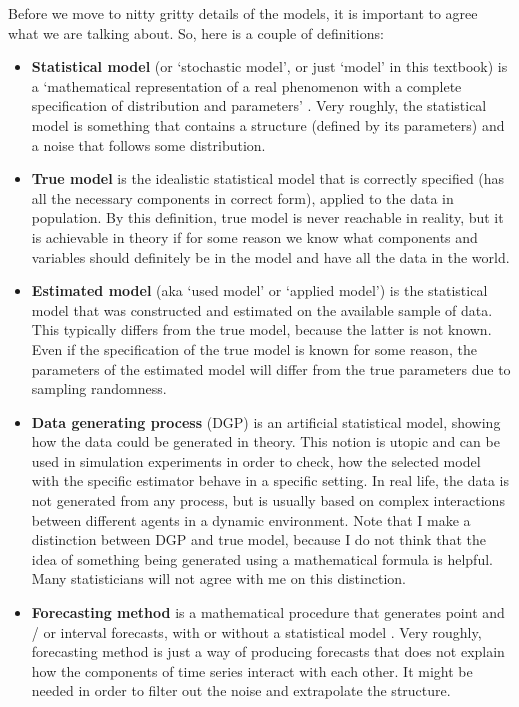 \documentclass[]{book}
\providecommand{\tightlist}{%
  \setlength{\itemsep}{0pt}\setlength{\parskip}{0pt}}
\begin{document}
Before we move to nitty gritty details of the models, it is important to agree what we are talking about. So, here is a couple of definitions:

\begin{itemize}
\tightlist
\item
  \textbf{Statistical model} (or `stochastic model', or just `model' in this textbook) is a `mathematical representation of a real phenomenon with a complete specification of distribution and parameters' \citep{Svetunkov2017a}. Very roughly, the statistical model is something that contains a structure (defined by its parameters) and a noise that follows some distribution.
\item
  \textbf{True model} is the idealistic statistical model that is correctly specified (has all the necessary components in correct form), applied to the data in population. By this definition, true model is never reachable in reality, but it is achievable in theory if for some reason we know what components and variables should definitely be in the model and have all the data in the world.
\item
  \textbf{Estimated model} (aka `used model' or `applied model') is the statistical model that was constructed and estimated on the available sample of data. This typically differs from the true model, because the latter is not known. Even if the specification of the true model is known for some reason, the parameters of the estimated model will differ from the true parameters due to sampling randomness.
\item
  \textbf{Data generating process} (DGP) is an artificial statistical model, showing how the data could be generated in theory. This notion is utopic and can be used in simulation experiments in order to check, how the selected model with the specific estimator behave in a specific setting. In real life, the data is not generated from any process, but is usually based on complex interactions between different agents in a dynamic environment. Note that I make a distinction between DGP and true model, because I do not think that the idea of something being generated using a mathematical formula is helpful. Many statisticians will not agree with me on this distinction.
\item
  \textbf{Forecasting method} is a mathematical procedure that generates point and / or interval forecasts, with or without a statistical model \citep{Svetunkov2017a}. Very roughly, forecasting method is just a way of producing forecasts that does not explain how the components of time series interact with each other. It might be needed in order to filter out the noise and extrapolate the structure.
\end{itemize}
\end{document}

